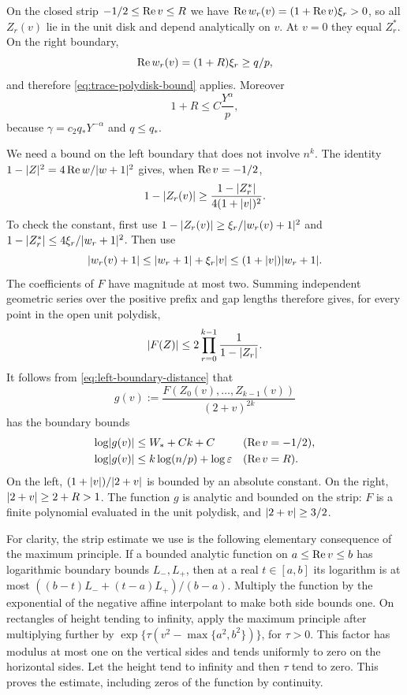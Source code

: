 On the closed strip $-1/2\le\operatorname{Re} v\le R$ we have
$\operatorname{Re} w_r(v)=(1+\operatorname{Re} v)\xi_r>0$, so all $Z_r(v)$ lie in the unit
disk and depend analytically on $v$.  At $v=0$ they equal $Z_r^*$.
On the right boundary,
\[
 \operatorname{Re} w_r(v)=(1+R)\xi_r\ge q/p,
\]
and therefore \eqref{eq:trace-polydisk-bound} applies.  Moreover
\begin{equation}
 1+R\le C\frac{Y^\alpha}{p},
 \label{eq:strip-width}
\end{equation}
because $\gamma=c_2q_*Y^{-\alpha}$ and $q\le q_*$.

We need a bound on the left boundary that does not involve $n^k$.
The identity $1-\lvert Z\rvert^2=4\operatorname{Re} w/\lvert w+1\rvert^2$ gives, when
$\operatorname{Re} v=-1/2$,
\begin{equation}
 1-\lvert Z_r(v)\rvert
 \ge\frac{1-\lvert Z_r^*\rvert}{4(1+\lvert v\rvert)^2}.
 \label{eq:left-boundary-distance}
\end{equation}
To check the constant, first use
$1-\lvert Z_r(v)\rvert\ge \xi_r/\lvert w_r(v)+1\rvert^2$ and
$1-\lvert Z_r^*\rvert\le4\xi_r/\lvert w_r+1\rvert^2$.
Then use
\[
 \lvert w_r(v)+1\rvert\le\lvert w_r+1\rvert+\xi_r\lvert v\rvert
                   \le(1+\lvert v\rvert)\lvert w_r+1\rvert.
\]
The coefficients of $F$ have magnitude at most two.  Summing
independent geometric series over the positive prefix and gap lengths
therefore gives, for every point in the open unit polydisk,
\[
 \lvert F(Z)\rvert\le2\prod_{r=0}^{k-1}\frac1{1-\lvert Z_r\rvert}.
\]
It follows from \eqref{eq:left-boundary-distance} that
\[
 g(v):=\frac{F(Z_0(v),\ldots,Z_{k-1}(v))}{(2+v)^{2k}}
\]
has the boundary bounds
\begin{equation}
 \begin{aligned}
 \log\lvert g(v)\rvert&\le W_*+Ck+C
                    &&(\operatorname{Re} v=-1/2),\\
 \log\lvert g(v)\rvert&\le k\log(n/p)+\log\varepsilon
                    &&(\operatorname{Re} v=R).
 \end{aligned}
 \label{eq:strip-side-bounds}
\end{equation}
On the left, $(1+\lvert v\rvert)/\lvert 2+v\rvert$ is bounded by an absolute
constant.  On the right, $\lvert 2+v\rvert\ge2+R>1$.
The function $g$ is analytic and bounded on the strip: $F$ is a finite
polynomial evaluated in the unit polydisk, and $\lvert 2+v\rvert\ge3/2$.

For clarity, the strip estimate we use is the following elementary
consequence of the maximum principle.  If a bounded analytic function
on $a\le\operatorname{Re} v\le b$ has logarithmic boundary bounds $L_-,L_+$,
then at a real $t\in[a,b]$ its logarithm is at most
$((b-t)L_-+(t-a)L_+)/(b-a)$.  Multiply the function by the exponential
of the negative affine interpolant to make both side bounds one.
On rectangles of height tending to infinity, apply the maximum
principle after multiplying further by
$\exp\{\tau(v^2-\max\{a^2,b^2\})\}$, for $\tau>0$.
This factor has modulus at most one on the vertical sides and tends
uniformly to zero on the horizontal sides.  Let the height tend to
infinity and then $\tau$ tend to zero.  This proves the estimate,
including zeros of the function by continuity.

